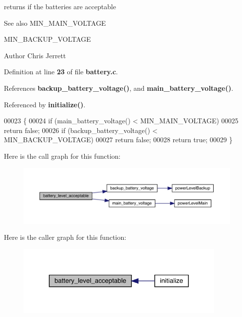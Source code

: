 returns if the batteries are acceptable 

\begin{DoxySeeAlso}{See also}
M\+I\+N\+\_\+\+M\+A\+I\+N\+\_\+\+V\+O\+L\+T\+A\+GE 

M\+I\+N\+\_\+\+B\+A\+C\+K\+U\+P\+\_\+\+V\+O\+L\+T\+A\+GE
\end{DoxySeeAlso}
\begin{DoxyAuthor}{Author}
Chris Jerrett 
\end{DoxyAuthor}


Definition at line \textbf{ 23} of file \textbf{ battery.\+c}.



References \textbf{ backup\+\_\+battery\+\_\+voltage()}, and \textbf{ main\+\_\+battery\+\_\+voltage()}.



Referenced by \textbf{ initialize()}.


\begin{DoxyCode}
00023                                 \{
00024   \textcolor{keywordflow}{if} (main_battery_voltage() < MIN\_MAIN\_VOLTAGE)
00025     \textcolor{keywordflow}{return} \textcolor{keyword}{false};
00026   \textcolor{keywordflow}{if} (backup_battery_voltage() < MIN\_BACKUP\_VOLTAGE)
00027     \textcolor{keywordflow}{return} \textcolor{keyword}{false};
00028   \textcolor{keywordflow}{return} \textcolor{keyword}{true};
00029 \}
\end{DoxyCode}
Here is the call graph for this function\+:
\nopagebreak
\begin{figure}[H]
\begin{center}
\leavevmode
\includegraphics[width=350pt]{battery_8c_a1097bbb878f6e2690f8eea6cd231959a_cgraph}
\end{center}
\end{figure}
Here is the caller graph for this function\+:
\nopagebreak
\begin{figure}[H]
\begin{center}
\leavevmode
\includegraphics[width=294pt]{battery_8c_a1097bbb878f6e2690f8eea6cd231959a_icgraph}
\end{center}
\end{figure}
\mbox{\label{battery_8c_a8c92c389534fdb079698cdebeb7f2efa}} 
